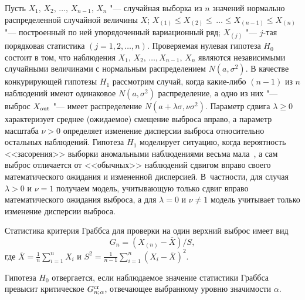 Пусть $X_1,\,X_2,\,\ldots,\,X_{n-1},\,X_n$ "---
случайная выборка из $n$ значений нормально распределенной
случайной величины  $X$;
$X_{(1)}\le X_{(2)}\le\,{\ldots\le X_{(n-1)}}\le
X_{(n)}$ "--- построенный по ней упорядоченный вариационный ряд;
$X_{(j)}$ "--- $j$-тая порядковая статистика $(j=1, 2, \dots, n)$.
Проверяемая нулевая гипотеза $H_0$ состоит в
том, что наблюдения
$X_1,\,X_2,\,\ldots,X_{n-1},\,X_n$
 являются
независимыми случайными величинами с нормальным распределением
$N(a,\sigma^2)$.
В качестве конкурирующей гипотезы $H_1$ рассмотрим случай, когда
какие-либо $(n-1)$ из $n$ наблюдений имеют одинаковое
$N(a,\sigma^2)$ распределение, а одно  из них "--- выброс $X_{\rm out}$ "--- имеет распределение $N(a+\lambda\sigma,\nu\sigma^2)$.
 Параметр сдвига $\lambda\ge 0$  характеризует  среднее (ожидаемое) смещение выброса вправо, а параметр масштаба $\nu>0$
 определяет изменение дисперсии выброса относительно остальных наблюдений.
 Гипотеза $H_1$ моделирует ситуацию, когда вероятность <<засорения>>  выборки
 аномальными наблюдениями
 весьма мала~\cite{Dav}, а сам выброс отличается от <<обычных>> наблюдений
 сдвигом вправо своего математического ожидания и измененной дисперсией.
 В~частности, для случая  $\lambda>0$ и $\nu=1$ получаем модель, учитывающую только сдвиг вправо математического ожидания выброса,  а для $\lambda=0$ и $\nu\neq1$ модель учитывает только изменение дисперсии выброса.

 Статистика критерия Граббса для проверки на один верхний выброс
имеет вид~\cite{Gru}
\begin{equation}
\label{Gn}
G_{n}=\left(X_{(n)}-\overline{X}\right)/S,
\end{equation}
где
$\overline{X}=\frac{1}{n}\sum\nolimits_{i=1}^{n}X_{i}$ и  $S^2=\frac{1}{n-1}\sum\nolimits_{i=1}^{n}(X_i-\overline{X})^2$.

Гипотеза $H_0$ отвергается, если наблюдаемое значение статистики Граббса превысит критическое
$G_{n;\alpha}^{\rm cr}$, отвечающее  выбранному уровню значимости $\alpha$.

